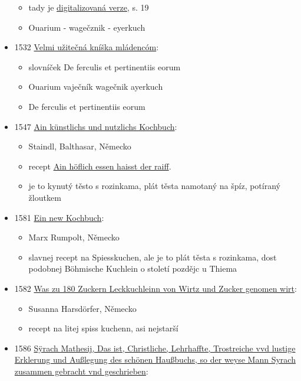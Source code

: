 \begin{itemize}
  \begin{itemize}
  \tightlist
  \item
    tady je
    \href{https://dbc.wroc.pl/dlibra/publication/33643/edition/30385/content?ref=L3B1YmxpY2F0aW9uLzM0Njg5L2VkaXRpb24vMzE0MTQ}{digitalizovaná
    verze}, s. 19
  \item
    Ouarium - wagečznik - eyerkuch
  \end{itemize}
\item
  1532
  \href{https://bara.ujc.cas.cz/slovniky/slovknm/slovknm31.html\#CTX1129}{Velmi
  užitečná kníška mládencóm}:

  \begin{itemize}
  \tightlist
  \item
    slovníček De ferculis et pertinentiis eorum
  \item
    Ouarium \textbar{} vaječník \textbar{} wagečnik \textbar{} ayerkuch
  \item
    De ferculis et pertinentiis eorum
  \end{itemize}
\item
  1547
  \href{https://www.digitale-sammlungen.de/view/bsb00023833?page=72\%2C73}{Ain
  künstlichs und nutzlichs Kochbuch}:

  \begin{itemize}
  \tightlist
  \item
    Staindl, Balthasar, Německo
  \item
    recept \hyperref[250922-1759]{Ain höflich essen haisst der raiff}.
  \item
    je to kynutý těsto s rozinkama, plát těsta namotaný na špíz,
    potíraný žloutkem
  \end{itemize}
\item
  1581 \href{https://cakes.institute/rumpolt.html}{Ein new Kochbuch}:

  \begin{itemize}
  \tightlist
  \item
    Marx Rumpolt, Německo
  \item
    slavnej recept na Spiesskuchen, ale je to plát těsta s rozinkama,
    dost podobnej Böhmische Kuchlein o století pozdějc u Thiema
  \end{itemize}
\item
  1582 \href{https://cakes.institute/harsdorfer.html}{Was zu 180 Zuckern
  Leckkuchleinn von Wirtz und Zucker genomen wirt}:

  \begin{itemize}
  \tightlist
  \item
    Susanna Harsdörfer, Německo
  \item
    recept na litej spiss kuchenn, asi nejstarší
  \end{itemize}
\item
  1586
  \href{https://books.google.cz/books?id=wN9YAAAAcAAJ&vq=ayerkuch&hl=cs&pg=PA101-IA1\#v=onepage&q&f=false}{Sÿrach
  Mathesij, Das ist, Christliche, Lehrhaffte, Trostreiche vvd lustige
  Erklerung und Außlegung des schönen Haußbuchs, so der weyse Mann
  Syrach zusammen gebracht vnd geschrieben}:


\end{itemize}
